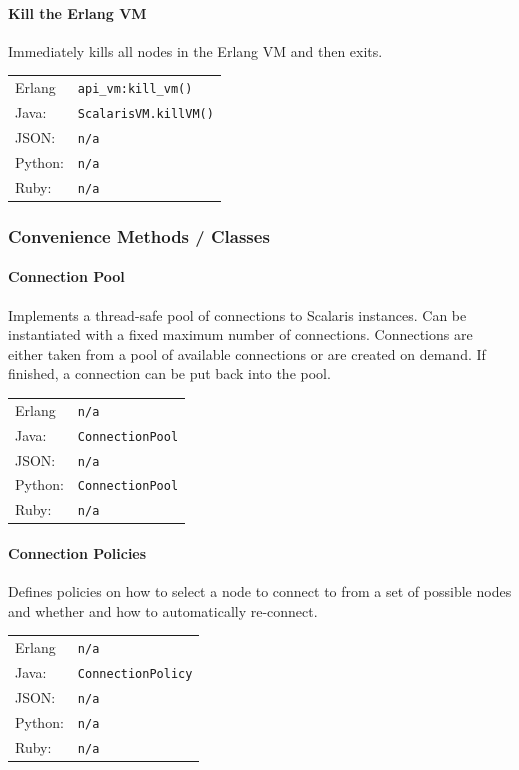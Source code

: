 \documentclass[a4paper]{scrreprt}
\newcommand{\code}[1]{\lstinline[basicstyle=\ttfamily]!#1!}
\begin{document}
\paragraph{Kill the Erlang VM}
Immediately kills all \scalaris{} nodes in the Erlang VM and then exits.

\begin{tabular}{lp{14cm}}
Erlang  & \code{api_vm:kill_vm()}\\
Java:   & \code{ScalarisVM.killVM()}\\
JSON:   & \code{n/a}\\
Python: & \code{n/a}\\
Ruby:   & \code{n/a}
\end{tabular}

\subsubsection{Convenience Methods / Classes}

\paragraph{Connection Pool}
Implements a thread-safe pool of connections to Scalaris instances. Can be
instantiated with a fixed maximum number of connections. Connections are either taken from
a pool of available connections or are created on demand. If finished, a connection can be
put back into the pool.

\begin{tabular}{ll}
Erlang  & \code{n/a}\\
Java:   & \code{ConnectionPool}\\
JSON:   & \code{n/a}\\
Python: & \code{ConnectionPool}\\
Ruby:   & \code{n/a}
\end{tabular}

\paragraph{Connection Policies}
Defines policies on how to select a node to connect to from a set of
possible nodes and whether and how to automatically re-connect.

\begin{tabular}{ll}
Erlang  & \code{n/a}\\
Java:   & \code{ConnectionPolicy}\\
JSON:   & \code{n/a}\\
Python: & \code{n/a}\\
Ruby:   & \code{n/a}
\end{tabular}
\end{document}

